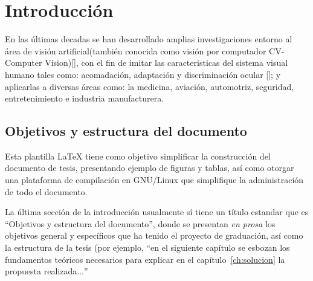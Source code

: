 
\chapter{Introducción}
\label{chp:intro}

En las últimas decadas se han desarrollado amplias investigaciones entorno al área de visión artificial(también conocida como visión por computador CV-Computer Vision)[], con el fin de imitar las caracteristicas del sistema visual humano tales como: acomadación, adaptación y discriminación ocular []; y aplicarlas a diversas áreas como: la medicina, aviación, automotriz, seguridad, entretenimiento e industria manufacturera. 



\section{Objetivos y estructura del documento}

Esta plantilla LaTeX tiene como objetivo simplificar la construcción del
documento de tesis, presentando ejemplo de figuras y tablas, así como otorgar
una plataforma de compilación en GNU/Linux que simplifique la administración de
todo el documento.

La última sección de la introducción usualmente sí tiene un título estandar que
es ``Objetivos y estructura del documento'', donde se presentan \emph{en prosa}
los objetivos general y específicos que ha tenido el proyecto de graduación,
así como la estructura de la tesis (por ejemplo, ``en el siguiente capítulo se
esbozan los fundamentos teóricos necesarios para explicar en el
capítulo~\ref{ch:solucion} la propuesta realizada$\ldots$''

